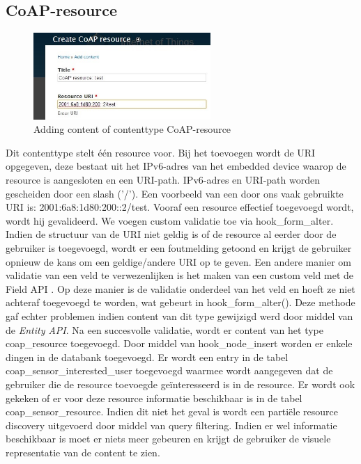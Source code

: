 \subsection{CoAP-resource}
\begin{figure}
\vspace{-10pt}
\centering
\label{fig:addCoapResource}
\includegraphics[width=0.6\textwidth]{fig/add_coap_resource}
\vspace{-20pt}
\centering
\caption{Adding content of contenttype CoAP-resource}
\centering
\vspace{-10pt}
\end{figure}
Dit contenttype stelt \'{e}\'{e}n resource voor. Bij het toevoegen wordt de URI opgegeven, deze bestaat uit het IPv6-adres van het embedded device waarop de resource is aangesloten en een URI-path. IPv6-adres en URI-path worden gescheiden door een slash ('/'). Een voorbeeld van een door ons vaak gebruikte URI is: 2001:6a8:1d80:200::2/test. Vooraf een resource effectief toegevoegd wordt, wordt hij gevalideerd. We voegen custom validatie toe via hook\_form\_alter. Indien de structuur van de URI niet geldig is of de resource al eerder door de gebruiker is toegevoegd, wordt er een foutmelding getoond en krijgt de gebruiker opnieuw de kans om een geldige/andere URI op te geven. Een andere manier om validatie van een veld te verwezenlijken is het maken van een custom veld met de Field API \cite{fieldAPI}. Op deze manier is de validatie onderdeel van het veld en hoeft ze niet achteraf toegevoegd te worden, wat gebeurt in hook\_form\_alter(). Deze methode gaf echter problemen indien content van dit type gewijzigd werd door middel van de \textit{Entity API}. Na een succesvolle validatie, wordt er content van het type coap\_resource toegevoegd. Door middel van hook\_node\_insert worden er enkele dingen in de databank toegevoegd. Er wordt een entry in de tabel coap\_sensor\_interested\_user toegevoegd waarmee wordt aangegeven dat de gebruiker die de resource toevoegde ge\"{i}nteresseerd is in de resource. Er wordt ook gekeken of er voor deze resource informatie beschikbaar is in de tabel coap\_sensor\_resource. Indien dit niet het geval is wordt een parti\"{e}le resource discovery uitgevoerd door middel van query filtering. Indien er wel informatie beschikbaar is moet er niets meer gebeuren en krijgt de gebruiker de visuele representatie van de content te zien.\\

